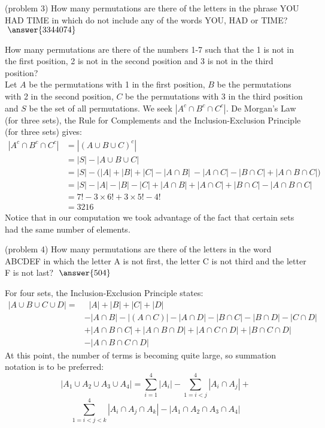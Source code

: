 \documentclass[handout]{ximera}
\begin{document}
\begin{problem}(problem 3)
How many permutations are there of the letters in the phrase YOU HAD TIME in which do not include any of the  
 words YOU, HAD or TIME? $\; \answer{3344074}$
\end{problem}

\begin{example}[example 4]
How many permutations are there of the numbers 1-7 such that the 1 is not in the first position, 2 is not in the 
second position and 3 is not in the third position?\\
Let $A$ be the permutations with 1 in the first position, $B$ be the permutations with 2 in the 
second position, $C$ be the permutations with 3 in the third position and $S$ be the set of all permutations. 
We seek $|A^c \cap B^c \cap C^c|$. 
De Morgan's Law (for three sets), the Rule for Complements and the Inclusion-Exclusion Principle (for three sets) gives:
\begin{align*}
|A^c \cap B^c \cap C^c| &= |(A \cup B \cup C)^c|\\
               &= |S| - |A\cup B \cup C|\\
               &= |S| - \Big(|A| + |B| + |C| - |A\cap B|\ - |A\cap C| - |B\cap C| + |A \cap B \cap C| \Big)\\
               &= |S| - |A| - |B| - |C| + |A\cap B| + |A\cap C| + |B\cap C| - |A\cap B \cap C|\\
               &= 7! - 3 \times 6! + 3 \times 5! - 4!\\
               &= 3216
\end{align*}
Notice that in our computation we took advantage of the fact that certain sets had the same number of elements.
\end{example}


\begin{problem}(problem 4)
How many permutations are there of the letters in the word ABCDEF in which the letter A is not 
first, the letter C is not third and the letter F is not last? $\; \answer{504}$
\end{problem}




For four sets, the Inclusion-Exclusion Principle states:
\begin{align*}
|A \cup B \cup C \cup D | = &\;\;|A|  + |B| + |C| + |D| \\
&- |A \cap B| - | (A \cap C)| - |A \cap D| - |B\cap C| - | B \cap D| 
- |C \cap D| \\
& +|A\cap B\cap C| + |A\cap B\cap D|+|A\cap C\cap D|+| B\cap C\cap D| \\
&- |A\cap B\cap C \cap D|
\end{align*}
At this point, the number of terms is becoming quite large, so summation notation is to be preferred:
\[
|A_1 \cup A_2 \cup A_3 \cup A_4 | = \sum_{i = 1}^4 |A_i| - \sum_{1 = i < j}^4 |A_i \cap A_j| + 
\]
\[
\sum_{1 = i < j< k }^4 |A_i \cap A_j \cap A_k| - |A_1 \cap A_2 \cap A_3 \cap A_4 |
\]
\end{document}
